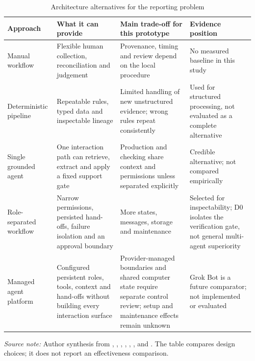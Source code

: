 \begin{table}[htbp]
  \centering
  \small
  \setlength{\tabcolsep}{3.5pt}
  \renewcommand{\arraystretch}{1.12}
  \begin{tabularx}{\textwidth}{@{}P{0.16\textwidth}P{0.25\textwidth}P{0.27\textwidth}Y@{}}
    \toprule
    \textbf{Approach} & \textbf{What it can provide} & \textbf{Main trade-off for this prototype} & \textbf{Evidence position} \\
    \midrule
    Manual workflow & Flexible human collection, reconciliation and judgement & Provenance, timing and review depend on the local procedure & No measured baseline in this study \\
    Deterministic pipeline & Repeatable rules, typed data and inspectable lineage & Limited handling of new unstructured evidence; wrong rules repeat consistently & Used for structured processing, not evaluated as a complete alternative \\
    Single grounded agent & One interaction path can retrieve, extract and apply a fixed support gate & Production and checking share context and permissions unless separated explicitly & Credible alternative; not compared empirically \\
    Role-separated workflow & Narrow permissions, persisted hand-offs, failure isolation and an approval boundary & More states, messages, storage and maintenance & Selected for inspectability; D0 isolates the verification gate, not general multi-agent superiority \\
    Managed agent platform & Configured persistent roles, tools, context and hand-offs without building every interaction surface & Provider-managed boundaries and shared computer state require separate control review; setup and maintenance effects remain unknown & Grok Bot is a future comparator; not implemented or evaluated \\
    \bottomrule
  \end{tabularx}

  \caption{Architecture alternatives for the reporting problem}
  \label{tab:lit-solution-landscape}
  \vspace{3pt}

  \parbox{\textwidth}{\scriptsize
    \textit{Source note:} Author synthesis from \citet{buneman2001provenance},
    \citet{nikiforova2020quality}, \citet{gao2023ragsurvey}, \citet{guo2024multiagent},
    \citet{wu2024autogen}, \citet{cemri2025masfailures}, \citet{dibia2024autogenstudio} and
    \citet{spacexai2026grokbot}. The table compares design choices; it does not report an
    effectiveness comparison.}
\end{table}
